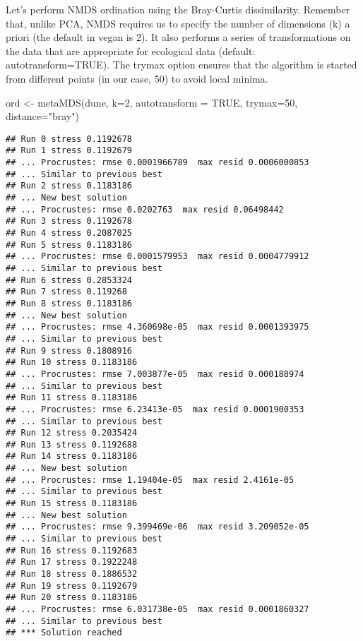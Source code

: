 \documentclass[
]{book}
\newenvironment{Shaded}{\begin{snugshade}}{\end{snugshade}}
\newcommand{\AttributeTok}[1]{\textcolor[rgb]{0.77,0.63,0.00}{#1}}
\newcommand{\ConstantTok}[1]{\textcolor[rgb]{0.00,0.00,0.00}{#1}}
\newcommand{\DecValTok}[1]{\textcolor[rgb]{0.00,0.00,0.81}{#1}}
\newcommand{\FunctionTok}[1]{\textcolor[rgb]{0.00,0.00,0.00}{#1}}
\newcommand{\NormalTok}[1]{#1}
\newcommand{\OtherTok}[1]{\textcolor[rgb]{0.56,0.35,0.01}{#1}}
\newcommand{\StringTok}[1]{\textcolor[rgb]{0.31,0.60,0.02}{#1}}
\begin{document}
Let's perform NMDS ordination using the Bray-Curtis dissimilarity. Remember that, unlike PCA, NMDS requires us to specify the number of dimensions (k) a priori (the default in vegan is 2). It also performs a series of transformations on the data that are appropriate for ecological data (default: autotransform=TRUE). The trymax option ensures that the algorithm is started from different points (in our case, 50) to avoid local minima.

\begin{Shaded}
\begin{Highlighting}[]
\NormalTok{ord }\OtherTok{\textless{}{-}} \FunctionTok{metaMDS}\NormalTok{(dune, }\AttributeTok{k=}\DecValTok{2}\NormalTok{, }\AttributeTok{autotransform =} \ConstantTok{TRUE}\NormalTok{, }\AttributeTok{trymax=}\DecValTok{50}\NormalTok{, }\AttributeTok{distance=}\StringTok{"bray"}\NormalTok{)}
\end{Highlighting}
\end{Shaded}

\begin{verbatim}
## Run 0 stress 0.1192678 
## Run 1 stress 0.1192679 
## ... Procrustes: rmse 0.0001966789  max resid 0.0006000853 
## ... Similar to previous best
## Run 2 stress 0.1183186 
## ... New best solution
## ... Procrustes: rmse 0.0202763  max resid 0.06498442 
## Run 3 stress 0.1192678 
## Run 4 stress 0.2087025 
## Run 5 stress 0.1183186 
## ... Procrustes: rmse 0.0001579953  max resid 0.0004779912 
## ... Similar to previous best
## Run 6 stress 0.2853324 
## Run 7 stress 0.119268 
## Run 8 stress 0.1183186 
## ... New best solution
## ... Procrustes: rmse 4.360698e-05  max resid 0.0001393975 
## ... Similar to previous best
## Run 9 stress 0.1808916 
## Run 10 stress 0.1183186 
## ... Procrustes: rmse 7.003877e-05  max resid 0.000188974 
## ... Similar to previous best
## Run 11 stress 0.1183186 
## ... Procrustes: rmse 6.23413e-05  max resid 0.0001900353 
## ... Similar to previous best
## Run 12 stress 0.2035424 
## Run 13 stress 0.1192688 
## Run 14 stress 0.1183186 
## ... New best solution
## ... Procrustes: rmse 1.19404e-05  max resid 2.4161e-05 
## ... Similar to previous best
## Run 15 stress 0.1183186 
## ... New best solution
## ... Procrustes: rmse 9.399469e-06  max resid 3.209052e-05 
## ... Similar to previous best
## Run 16 stress 0.1192683 
## Run 17 stress 0.1922248 
## Run 18 stress 0.1886532 
## Run 19 stress 0.1192679 
## Run 20 stress 0.1183186 
## ... Procrustes: rmse 6.031738e-05  max resid 0.0001860327 
## ... Similar to previous best
## *** Solution reached
\end{verbatim}
\end{document}
